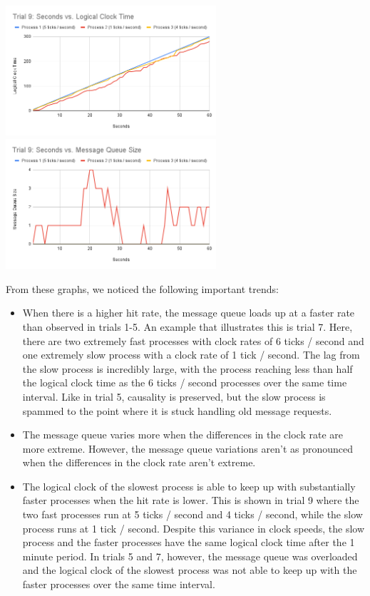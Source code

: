 \documentclass[
	a4paper, %
	10pt, %
	unnumberedsections, %
	twoside, %
]{LTJournalArticle}
\begin{document}
\includegraphics[width=7.8cm]{assets/t9_clock.png}
\includegraphics[width=7.8cm]{assets/t9_size.png}

From these graphs, we noticed the following important trends: 
\begin{itemize}
    \item When there is a higher hit rate, the message queue loads up at a faster rate than observed in trials 1-5. An example that illustrates this is trial 7. Here, there are two extremely fast processes with clock rates of 6 ticks / second and one extremely slow process with a clock rate of 1 tick / second. The lag from the slow process is incredibly large, with the process reaching less than half the logical clock time as the 6 ticks / second processes over the same time interval. Like in trial 5, causality is preserved, but the slow process is spammed to the point where it is stuck handling old message requests.
    \item The message queue varies more when the differences in the clock rate are more extreme. However, the message queue variations aren't as pronounced when the differences in the clock rate aren't extreme. 
    \item The logical clock of the slowest process is able to keep up with substantially faster processes when the hit rate is lower. This is shown in trial 9 where the two fast processes run at 5 ticks / second and 4 ticks / second, while the slow process runs at 1 tick / second. Despite this variance in clock speeds, the slow process and the faster processes have the same logical clock time after the 1 minute period. In trials 5 and 7, however, the message queue was overloaded and the logical clock of the slowest process was not able to keep up with the faster processes over the same time interval. 
    
\end{itemize}
\end{document}

